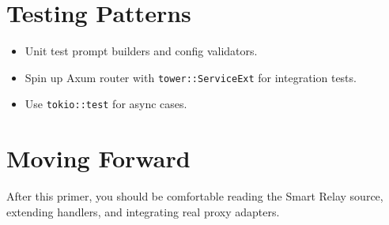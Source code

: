 \section{Testing Patterns}
\begin{itemize}
    \item Unit test prompt builders and config validators.
    \item Spin up Axum router with \texttt{tower::ServiceExt} for integration tests.
    \item Use \texttt{tokio::test} for async cases.
\end{itemize}

\section{Moving Forward}
After this primer, you should be comfortable reading the Smart Relay source, extending handlers, and integrating real proxy adapters.

